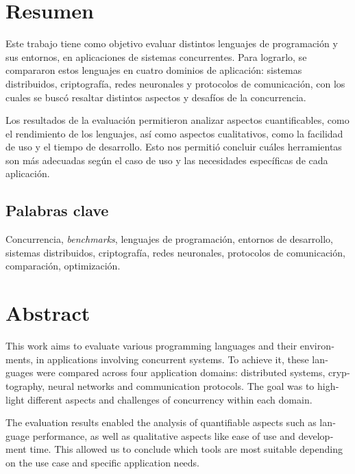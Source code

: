 \documentclass[11pt]{article}
\let\Oldsection\section
\renewcommand{\section}{\FloatBarrier\Oldsection}
\let\Oldsubsection\subsection
\renewcommand{\subsection}{\FloatBarrier\Oldsubsection}
\newcommand{\english}[1]{\textit{#1}}
\begin{document}


\tableofcontents
\newpage

\section{Resumen}


Este trabajo tiene como objetivo evaluar distintos lenguajes de programación y sus entornos, en aplicaciones de sistemas concurrentes. Para lograrlo, se compararon estos lenguajes en cuatro dominios de aplicación: sistemas distribuidos, criptografía, redes neuronales y protocolos de comunicación, con los cuales se buscó resaltar distintos aspectos y desafíos de la concurrencia.

Los resultados de la evaluación permitieron analizar aspectos cuantificables, como el rendimiento de los lenguajes, así como aspectos cualitativos, como la facilidad de uso y el tiempo de desarrollo. Esto nos permitió concluir cuáles herramientas son más adecuadas según el caso de uso y las necesidades específicas de cada aplicación.

\subsection{Palabras clave}

Concurrencia, \english{benchmarks}, lenguajes de programación, entornos de desarrollo, sistemas distribuidos, criptografía, redes neuronales, protocolos de comunicación, comparación, optimización.

\newpage

\section{Abstract}

\begin{otherlanguage}{english}
This work aims to evaluate various programming languages and their environments, in applications involving concurrent systems. To achieve it, these languages were compared across four application domains: distributed systems, cryptography, neural networks and communication protocols. The goal was to highlight different aspects and challenges of concurrency within each domain.

The evaluation results enabled the analysis of quantifiable aspects such as language performance, as well as qualitative aspects like ease of use and development time. This allowed us to conclude which tools are most suitable depending on the use case and specific application needs.
\end{otherlanguage}
\end{document}
